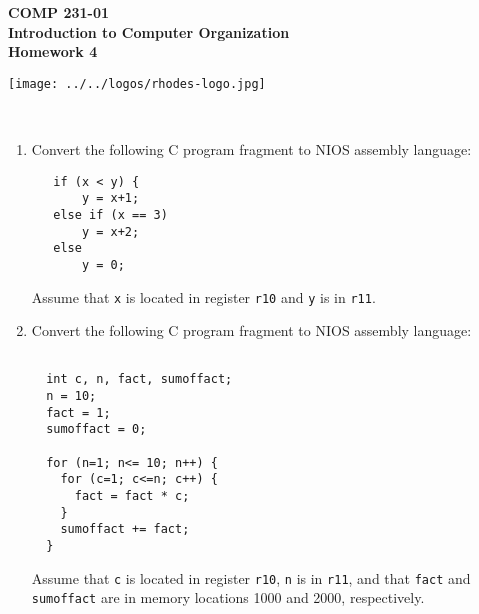 \documentclass[10pt]{article}
\begin{document}

\hspace{-5mm}
\begin{minipage}{0.65\linewidth}
  \textbf{
      \hspace{-3mm}
      {\Large COMP 231-01}\\
      {\Large Introduction to Computer Organization}\\
      {\Large Homework 4}}
\end{minipage}
\begin{minipage}{0.35\linewidth}
  \texttt{[image: ../../logos/rhodes-logo.jpg]}
\end{minipage}

\\


\begin{enumerate}

\setlength\itemsep{10mm}

\item Convert the following C program fragment to NIOS assembly
  language:

\begin{verbatim}
   if (x < y) {
       y = x+1;
   else if (x == 3)
       y = x+2;
   else
       y = 0;
\end{verbatim}

Assume that {\tt x} is located in register {\tt r10} and {\tt y} is in
{\tt r11}.


\item Convert the following C program fragment to NIOS assembly
  language:

\begin{verbatim}

  int c, n, fact, sumoffact;
  n = 10;
  fact = 1;
  sumoffact = 0;

  for (n=1; n<= 10; n++) {
    for (c=1; c<=n; c++) {
      fact = fact * c;
    }
    sumoffact += fact;
  }

\end{verbatim}

Assume that {\tt c} is located in register {\tt r10},  {\tt n} is in
{\tt r11}, and that {\tt fact} and {\tt sumoffact} are in memory
locations 1000 and 2000, respectively.

\end{enumerate}
\end{document}
